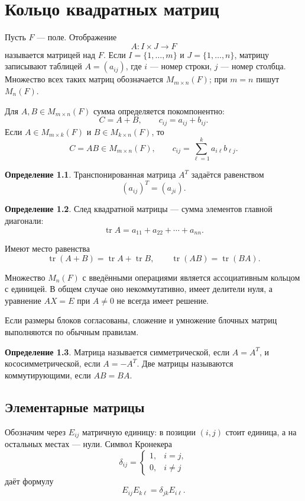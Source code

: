 \documentclass[12pt,a4paper,oneside,openany]{book}
\theoremstyle{definition}
\newtheorem{definition}{Определение}[chapter]
\theoremstyle{plain}
\theoremstyle{remark}
\DeclareMathOperator{\tr}{tr}
\begin{document}
\chapter{Кольцо квадратных матриц}

Пусть $F$ --- поле. Отображение
\[
  A\colon I\times J\to F
\]
называется матрицей над $F$. Если $I=\{1,\ldots,m\}$ и
$J=\{1,\ldots,n\}$, матрицу записывают таблицей $A=(a_{ij})$, где
$i$ --- номер строки, $j$ --- номер столбца. Множество всех таких матриц
обозначается $M_{m\times n}(F)$; при $m=n$ пишут $M_n(F)$.

Для $A,B\in M_{m\times n}(F)$ сумма определяется покомпонентно:
\[
  C=A+B,\qquad c_{ij}=a_{ij}+b_{ij}.
\]
Если $A\in M_{m\times k}(F)$ и $B\in M_{k\times n}(F)$, то
\[
  C=AB\in M_{m\times n}(F),
  \qquad
  c_{ij}=\sum_{\ell=1}^{k}a_{i\ell}b_{\ell j}.
\]

\begin{definition}
Транспонированная матрица $A^T$ задаётся равенством
\[
  (a_{ij})^T=(a_{ji}).
\]
\end{definition}

\begin{definition}
След квадратной матрицы --- сумма элементов главной диагонали:
\[
  \tr A=a_{11}+a_{22}+\cdots+a_{nn}.
\]
\end{definition}

Имеют место равенства
\[
  \tr(A+B)=\tr A+\tr B,
  \qquad
  \tr(AB)=\tr(BA).
\]

Множество $M_n(F)$ с введёнными операциями является ассоциативным кольцом
с единицей. В общем случае оно некоммутативно, имеет делители нуля, а
уравнение $AX=E$ при $A\ne0$ не всегда имеет решение.


Если размеры блоков согласованы, сложение и умножение блочных матриц
выполняются по обычным правилам.

\begin{definition}
Матрица называется симметрической, если $A=A^T$, и кососимметрической,
если $A=-A^T$. Две матрицы называются коммутирующими, если $AB=BA$.
\end{definition}

\section{Элементарные матрицы}

Обозначим через $E_{ij}$ матричную единицу: в позиции $(i,j)$ стоит
единица, а на остальных местах --- нули. Символ Кронекера
\[
  \delta_{ij}=\begin{cases}1,&i=j,\\0,&i\ne j\end{cases}
\]
даёт формулу
\[
  E_{ij}E_{k\ell}=\delta_{jk}E_{i\ell}.
\]
\end{document}
